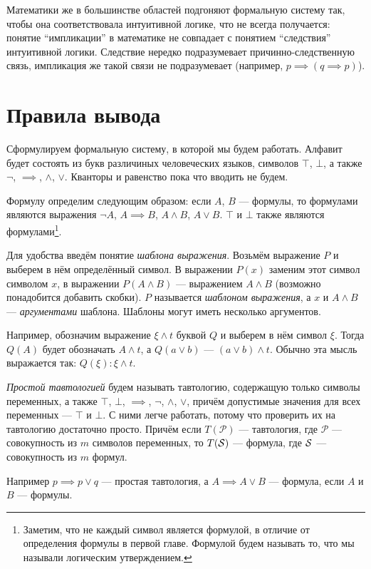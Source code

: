 Математики же
в большинстве областей подгоняют формальную систему так,
чтобы она соответствовала интуитивной логике,
что не всегда получается: понятие ``импликации'' в математике не совпадает
с понятием ``следствия'' интуитивной логики. Следствие
нередко подразумевает причинно-следственную
связь, импликация же такой связи не подразумевает (например, ${p\implies(q\implies p)}$).

\section{Правила вывода}

Сформулируем формальную систему, в которой мы будем работать.
Алфавит будет состоять из букв различиных человеческих языков, символов $\top$,
$\bot$, а также $\lnot$, $\implies$, $\land$, $\lor$. Кванторы и равенство пока
что вводить не будем.

Формулу определим следующим образом: если $A$, $B$ --- формулы, то формулами
являются выражения $\lnot A$, ${A\implies B}$, $A\land B$, $A\lor B$.
$\top$ и $\bot$ также являются формулами\footnote{
	Заметим, что не каждый символ является формулой, в отличие от определения
	формулы в первой главе. Формулой будем называть то, что мы называли
	логическим утверждением.
}.

Для удобства введём понятие {\it шаблона выражения}. Возьмём выражение $P$ и выберем
в нём определённый символ. В выражении $P(x)$ заменим этот символ символом $x$,
в выражении $P(A\land B)$ --- выражением $A\land B$ (возможно понадобится добавить
скобки). $P$ называется {\it шаблоном выражения}, а $x$ и $A\land B$ ---
{\it аргументами} шаблона.
Шаблоны могут иметь несколько аргументов.

Например, обозначим выражение $\xi\land t$ буквой $Q$ и выберем в нём символ $\xi$.
Тогда $Q(A)$ будет обозначать $A\land t$, а $Q(a\lor b)$ --- $(a\lor b)\land t$.
Обычно эта мысль выражается так: $Q(\xi): \xi\land t$.

\newcommand\Px{\mathcal P}
{\it Простой тавтологией} будем называть тавтологию, содержащую только символы
переменных, а также $\top$, $\bot$, $\implies$, $\lnot$, $\land$, $\lor$, причём
допустимые значения для всех переменных --- $\top$ и $\bot$. С ними легче
работать, потому что проверить их на тавтологию достаточно просто. Причём
если $T(\Px)$ --- тавтология, где $\Px$ --- совокупность из $m$ символов
переменных, то $T(\mathcal S)$ --- формула, где $\mathcal S$ --- совокупность из $m$ формул.

Например $p\implies p\lor q$ --- простая тавтология, а $A\implies A\lor B$ --- формула,
если $A$ и $B$ --- формулы.

